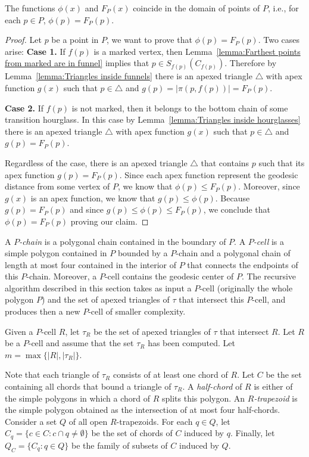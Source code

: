 \documentclass[a4paper,UKenglish]{lipics}
\newcommand{\F}[2]{\ensuremath{F_{\scriptscriptstyle #1}(#2)}}
\newcommand{\fn}[2]{\ensuremath{S_{\scriptscriptstyle #1}(#2)}}
\newcommand{\ff}[1]{\ensuremath{f(#1)}}
\newcommand{\g}[2]{\ensuremath{|\pi(#1, #2)|}}
\begin{document}
\begin{lemma}\label{lemma:Optimization problem same as geodesic center}
The functions $\phi(x)$ and $\F{P}{x}$ coincide in the domain of points of $P$, i.e., for each $p\in P$, $\phi(p) = \F{P}{p}$.
\end{lemma}
\begin{proof}
Let $p$ be a point in $P$, we want to prove that $\phi(p) = \F{P}{p}$. 
Two cases arise: 
\textbf{Case 1.} If $\ff{p}$ is a marked vertex, then Lemma~\ref{lemma:Farthest points from marked are in funnel} implies that $p\in \fn{\ff{p}}{C_{\ff{p}}}$. Therefore
by Lemma~\ref{lemma:Triangles inside funnels} there is an apexed triangle $\triangle$ with apex function $g(x)$ such that $p\in \triangle$ and $g(p) = \g{p}{\ff{p}} = \F{P}{p}$.

\textbf{Case 2.} If $\ff{p}$ is not marked, then it belongs to the bottom chain of some transition hourglass. In this case by Lemma~\ref{lemma:Triangles inside hourglasses} there is an apexed triangle $\triangle$ with apex function $g(x)$ such that $p\in \triangle$ and $g(p) = \F{P}{p}$.

Regardless of the case, there is an apexed triangle $\triangle$ that contains $p$ such that its apex function $g(p) = \F{P}{p}$.
Since each apex function represent the geodesic distance from some vertex of $P$, we know that $\phi(p) \leq \F{P}{p}$. Moreover, since $g(x)$ is an apex function, we know that $g(p) \leq \phi(p)$.
Because $g(p) = \F{P}{p}$ and since $g(p) \leq \phi(p) \leq  \F{P}{p}$, we conclude that $\phi(p) = \F{P}{p}$ proving our claim.
\end{proof}


A \emph{$P$-chain} is a polygonal chain contained in the boundary of $P$.
A \emph{$P$-cell} is a simple polygon contained in $P$ bounded by a $P$-chain and a polygonal chain of length at most four contained in the interior of $P$ that connects the endpoints of this $P$-chain. Moreover, a $P$-cell contains the geodesic center of $P$.
The recursive algorithm described in this section takes as input a $P$-cell (originally the whole polygon $P$) and the set of apexed triangles of $\tau$ that intersect this $P$-cell, and produces then a new $P$-cell of smaller complexity.

Given a $P$-cell $R$, let $\tau_R$ be the set of apexed triangles of $\tau$ that intersect $R$.
Let $R$ be a $P$-cell and assume that the set $\tau_R$ has been computed.
Let $m = \max\{|R|, |\tau_R|\}$.

Note that each triangle of $\tau_R$ consists of at least one chord of $R$.
Let $C$ be the set containing all chords that bound a triangle of $\tau_R$. 
A \emph{half-chord} of $R$ is either of the simple polygons in which a chord of $R$ splits this polygon.
An \emph{$R$-trapezoid} is the simple polygon obtained as the intersection of at most four half-chords.
Consider a set $Q$ of all open $R$-trapezoids. 
For each $q\in Q$, let $C_q = \{c\in C: c\cap q \neq \emptyset\}$ be the set of chords of $C$ induced by $q$. 
Finally, let $Q_C = \{C_q : q\in Q\}$ be the family of subsets of $C$ induced by $Q$.
\end{document}
